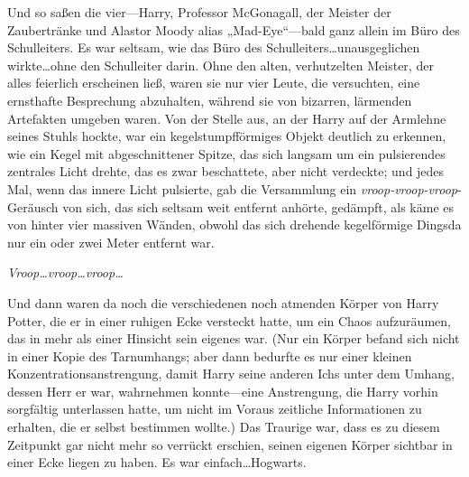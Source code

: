 Und so saßen die vier—Harry, Professor McGonagall, der Meister der Zaubertränke und Alastor Moody alias „Mad-Eye“—bald ganz allein im Büro des Schulleiters. Es war seltsam, wie das Büro des Schulleiters…unausgeglichen wirkte…ohne den Schulleiter darin. Ohne den alten, verhutzelten Meister, der alles feierlich erscheinen ließ, waren sie nur vier Leute, die versuchten, eine ernsthafte Besprechung abzuhalten, während sie von bizarren, lärmenden Artefakten umgeben waren. Von der Stelle aus, an der Harry auf der Armlehne seines Stuhls hockte, war ein kegelstumpfförmiges Objekt deutlich zu erkennen, wie ein Kegel mit abgeschnittener Spitze, das sich langsam um ein pulsierendes zentrales Licht drehte, das es zwar beschattete, aber nicht verdeckte; und jedes Mal, wenn das innere Licht pulsierte, gab die Versammlung ein \emph{vroop-vroop-vroop}-Geräusch von sich, das sich seltsam weit entfernt anhörte, gedämpft, als käme es von hinter vier massiven Wänden, obwohl das sich drehende kegelförmige Dingsda nur ein oder zwei Meter entfernt war.

\emph{Vroop…vroop…vroop…}

Und dann waren da noch die verschiedenen noch atmenden Körper von Harry Potter, die er in einer ruhigen Ecke versteckt hatte, um ein Chaos aufzuräumen, das in mehr als einer Hinsicht sein eigenes war. (Nur ein Körper befand sich nicht in einer Kopie des Tarnumhangs; aber dann bedurfte es nur einer kleinen Konzentrationsanstrengung, damit Harry seine anderen Ichs unter dem Umhang, dessen Herr er war, wahrnehmen konnte—eine Anstrengung, die Harry vorhin sorgfältig unterlassen hatte, um nicht im Voraus zeitliche Informationen zu erhalten, die er selbst bestimmen wollte.) Das Traurige war, dass es zu diesem Zeitpunkt gar nicht mehr so verrückt erschien, seinen eigenen Körper sichtbar in einer Ecke liegen zu haben. Es war einfach…Hogwarts.

